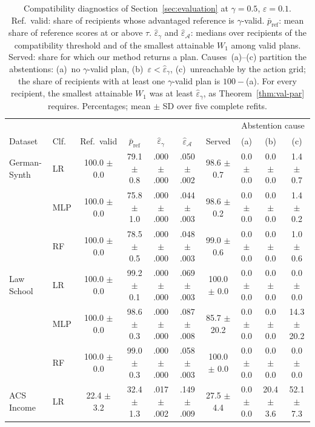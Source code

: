 \begin{table}[t]
\centering
\footnotesize
\caption{Compatibility diagnostics of Section~\ref{sec:evaluation} at
$\gamma=0.5$, $\varepsilon=0.1$. Ref.\ valid: share of recipients whose
advantaged reference is $\gamma$-valid. $\bar p_{\mathrm{ref}}$: mean share
of reference scores at or above $\tau$. $\hat\varepsilon_\gamma$ and
$\hat\varepsilon_{\mathcal A}$: medians over recipients of the compatibility
threshold and of the smallest attainable $W_1$ among valid plans. Served:
share for which our method returns a plan. Causes~(a)--(c) partition the
abstentions: (a)~no $\gamma$-valid plan, (b)~$\varepsilon<
\hat\varepsilon_\gamma$, (c)~unreachable by the action grid; the share of
recipients with at least one $\gamma$-valid plan is $100-$(a). For
every recipient, the smallest attainable $W_1$ was at least
$\hat\varepsilon_\gamma$, as Theorem~\ref{thm:val-par} requires. Percentages;
mean $\pm$ SD over five complete refits.}
\label{tab:app_compat}
\setlength{\tabcolsep}{3pt}
\begin{tabular}{ll cccc c ccc}
\hline
& & & & & & & \multicolumn{3}{c}{Abstention cause} \\
Dataset & Clf. & Ref.\ valid & $\bar p_{\mathrm{ref}}$ &
$\hat\varepsilon_\gamma$ & $\hat\varepsilon_{\mathcal A}$ & Served &
(a) & (b) & (c) \\
\hline
German-Synth & LR & 100.0 $\pm$ 0.0 & 79.1 $\pm$ 0.8 & .000 $\pm$ .000 & .050 $\pm$ .002 & 98.6 $\pm$ 0.7 & 0.0 $\pm$ 0.0 & 0.0 $\pm$ 0.0 & 1.4 $\pm$ 0.7 \\
 & MLP & 100.0 $\pm$ 0.0 & 75.8 $\pm$ 1.0 & .000 $\pm$ .000 & .044 $\pm$ .003 & 98.6 $\pm$ 0.2 & 0.0 $\pm$ 0.0 & 0.0 $\pm$ 0.0 & 1.4 $\pm$ 0.2 \\
 & RF & 100.0 $\pm$ 0.0 & 78.5 $\pm$ 0.5 & .000 $\pm$ .000 & .048 $\pm$ .003 & 99.0 $\pm$ 0.6 & 0.0 $\pm$ 0.0 & 0.0 $\pm$ 0.0 & 1.0 $\pm$ 0.6 \\
\hline
Law School & LR & 100.0 $\pm$ 0.0 & 99.2 $\pm$ 0.1 & .000 $\pm$ .000 & .069 $\pm$ .003 & 100.0 $\pm$ 0.0 & 0.0 $\pm$ 0.0 & 0.0 $\pm$ 0.0 & 0.0 $\pm$ 0.0 \\
 & MLP & 100.0 $\pm$ 0.0 & 98.6 $\pm$ 0.3 & .000 $\pm$ .000 & .087 $\pm$ .008 & 85.7 $\pm$ 20.2 & 0.0 $\pm$ 0.0 & 0.0 $\pm$ 0.0 & 14.3 $\pm$ 20.2 \\
 & RF & 100.0 $\pm$ 0.0 & 99.0 $\pm$ 0.3 & .000 $\pm$ .000 & .058 $\pm$ .003 & 100.0 $\pm$ 0.0 & 0.0 $\pm$ 0.0 & 0.0 $\pm$ 0.0 & 0.0 $\pm$ 0.0 \\
\hline
ACS Income & LR & 22.4 $\pm$ 3.2 & 32.4 $\pm$ 1.3 & .017 $\pm$ .002 & .149 $\pm$ .009 & 27.5 $\pm$ 4.4 & 0.0 $\pm$ 0.0 & 20.4 $\pm$ 3.6 & 52.1 $\pm$ 7.3 \\

\end{tabular}
\end{table}
